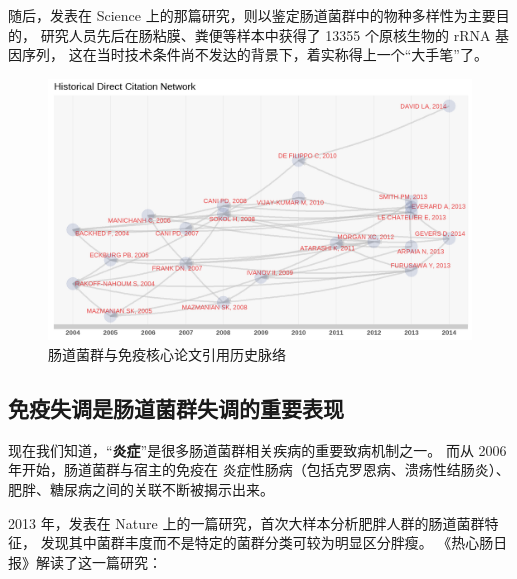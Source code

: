 \documentclass[]{ctexbook}
\begin{document}
随后，发表在 Science 上的那篇研究，则以鉴定肠道菌群中的物种多样性为主要目的，
研究人员先后在肠粘膜、粪便等样本中获得了 13355 个原核生物的 rRNA 基因序列，
这在当时技术条件尚不发达的背景下，着实称得上一个``大手笔''了\citep{eckburgDiversityHumanIntestinal2005}。

\begin{figure}
\includegraphics[width=1\linewidth]{plots/immune-article-histnet-1} \caption{肠道菌群与免疫核心论文引用历史脉络}\label{fig:immune-article-histnet}
\end{figure}

\hypertarget{ux514dux75abux5931ux8c03ux662fux80a0ux9053ux83ccux7fa4ux5931ux8c03ux7684ux91cdux8981ux8868ux73b0}{%
\subsection{免疫失调是肠道菌群失调的重要表现}\label{ux514dux75abux5931ux8c03ux662fux80a0ux9053ux83ccux7fa4ux5931ux8c03ux7684ux91cdux8981ux8868ux73b0}}

现在我们知道，``\textbf{炎症}''是很多肠道菌群相关疾病的重要致病机制之一。
而从 2006 年开始，肠道菌群与宿主的免疫在
炎症性肠病\citep{frankMolecularphylogeneticCharacterizationMicrobial2007, mazmanianMicrobialSymbiosisFactor2008, frankMolecularphylogeneticCharacterizationMicrobial2007, manichanhReducedDiversityFaecal2006}（包括克罗恩病、溃疡性结肠炎）、
肥胖、糖尿病之间的关联不断被揭示出来\citep{caniChangesGutMicrobiota2008}。

2013 年，发表在 Nature 上的一篇研究，首次大样本分析肥胖人群的肠道菌群特征，
发现其中菌群丰度而不是特定的菌群分类可较为明显区分胖瘦\citep{lechatelierRichnessHumanGut2013b}。
《热心肠日报》解读了这一篇研究：
\end{document}
